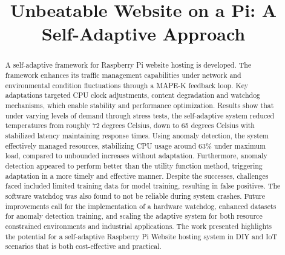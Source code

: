 \documentclass[conference]{IEEEtran}
\begin{document}
\title{Unbeatable Website on a Pi: A Self-Adaptive Approach\\
}

\author{

    \and

}

\maketitle

\begin{abstract}
A self-adaptive framework for Raspberry Pi website hosting is developed. The framework enhances its traffic management capabilities under network and environmental condition fluctuations through a MAPE-K feedback loop. Key adaptations targeted CPU clock adjustments, content degradation and watchdog mechanisms, which enable stability and performance optimization. Results show that under varying levels of demand through stress tests, the self-adaptive system reduced temperatures from roughly 72 degrees Celsius, down to 65 degrees Celsius with stabilized latency maintaining response times. Using anomaly detection, the system effectively managed resources, stabilizing CPU usage around 63\% under maximum load, compared to unbounded increases without adaptation. Furthermore, anomaly detection appeared to perform better than the utility function method, triggering adaptation in a more timely and effective manner. Despite the successes, challenges faced included limited training data for model training, resulting in false positives. The software watchdog was also found to not be reliable during system crashes. Future improvements call for the implementation of a hardware watchdog, enhanced datasets for anomaly detection training, and scaling the adaptive system for both resource constrained environments and industrial applications. The work presented highlights the potential for a self-adaptive Raspberry Pi Website hosting system in DIY and IoT scenarios that is both cost-effective and practical.
\end{abstract}
\end{document}
